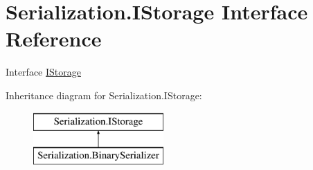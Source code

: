 \hypertarget{interface_serialization_1_1_i_storage}{}\section{Serialization.\+I\+Storage Interface Reference}
\label{interface_serialization_1_1_i_storage}


Interface \hyperlink{interface_serialization_1_1_i_storage}{I\+Storage}  


Inheritance diagram for Serialization.\+I\+Storage\+:\begin{figure}[H]
\begin{center}
\leavevmode
\includegraphics[height=2.000000cm]{interface_serialization_1_1_i_storage}
\end{center}
\end{figure}
